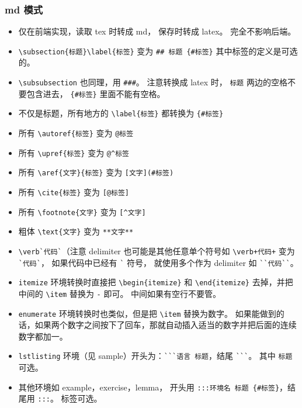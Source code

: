 \subsubsection{md 模式}
\begin{itemize}
\item 仅在前端实现，读取 tex 时转成 md， 保存时转成 latex。 完全不影响后端。
\item \verb`\subsection{标题}\label{标签}` 变为 \verb`## 标题 {#标签}` 其中标签的定义是可选的。
\item \verb`\subsubsection` 也同理，用 \verb`###`。 注意转换成 latex 时， \verb`标题` 两边的空格不要包含进去， \verb`{#标签}` 里面不能有空格。
\item 不仅是标题，所有地方的 \verb`\label{标签}` 都转换为 \verb`{#标签}`
\item 所有 \verb`\autoref{标签}` 变为 \verb`@标签`
\item 所有 \verb`\upref{标签}` 变为 \verb`@^标签`
\item 所有 \verb`\aref{文字}{标签}` 变为 \verb`[文字](#标签)`
\item 所有 \verb`\cite{标签}` 变为 \verb`[@标签]`
\item 所有 \verb`\footnote{文字}` 变为 \verb`[^文字]`
\item 粗体 \verb`\text{文字}` 变为 \verb`**文字**`
\item \verb|\verb`代码`|（注意 delimiter 也可能是其他任意单个符号如 \verb`\verb+代码+` 变为 \verb|`代码`|， 如果代码中已经有 \verb|`| 符号， 就使用多个作为 delimiter 如 \verb|``代码``|。
\item \verb`itemize` 环境转换时直接把 \verb`\begin{itemize}` 和 \verb`\end{itemize}` 去掉，并把中间的 \verb`\item` 替换为 \verb`-` 即可。 中间如果有空行不要管。
\item \verb`enumerate` 环境转换时也类似，但是把 \verb`\item` 替换为数字。 如果能做到的话，如果两个数字之间按下了回车，那就自动插入适当的数字并把后面的连续数字都加一。
\item \verb`lstlisting` 环境（见 sample）开头为：\verb|```语言 标题|，结尾 \verb|```|。 其中 \verb`标题` 可选。
\item 其他环境如 example，exercise，lemma， 开头用 \verb`:::环境名 标题 {#标签}`，结尾用 \verb`:::`。 标签可选。
\end{itemize}

